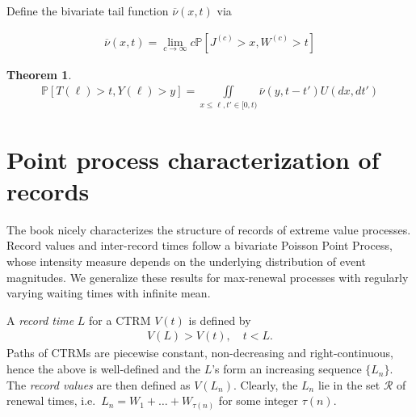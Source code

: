\documentclass[12pt]{article}
\newtheorem{theorem}[equation]{Theorem}
\newcommand{\pr}{\mathbb {P}}
\newcommand{\1}{\mathbf 1}
\begin{document}
Define the bivariate tail function $\overline \nu(x,t)$ via 

\begin{align}
\overline \nu(x,t) = \lim_{c \to \infty} c \pr [J^{(c)} > x, W^{(c)} > t]
\end{align}


\begin{theorem}
\begin{align}
\pr [T(\ell) > t, Y(\ell) > y]
= \iint\limits_{x \le \ell, t' \in [0,t)} \overline \nu(y, t - t') U(dx, dt')
\end{align}
\end{theorem}


\section{Point process characterization of records}
\label{sec:records}


The book \cite[Chapter 4]{resnick2013extreme} nicely characterizes the structure of records of extreme value processes. Record values and inter-record times follow a bivariate Poisson Point Process, whose intensity measure depends on the underlying distribution of event magnitudes. We generalize these results for max-renewal processes with regularly varying waiting times with infinite mean. 

A \textit{record time} $L$ for a CTRM $V(t)$ is defined by 
\begin{align*}
V(L) > V(t), \quad t < L.
\end{align*}
Paths of CTRMs are piecewise constant, non-decreasing and right-continuous, hence the above is well-defined and the $L$'s form an increasing sequence $\{L_n\}$. The \textit{record values} are then defined as $V(L_n)$. Clearly, the $L_n$ lie in the set $\mathcal R$ of renewal times, i.e.\ $L_n = W_1 + \ldots + W_{\tau(n)}$ for some integer $\tau(n)$. 
\end{document}
